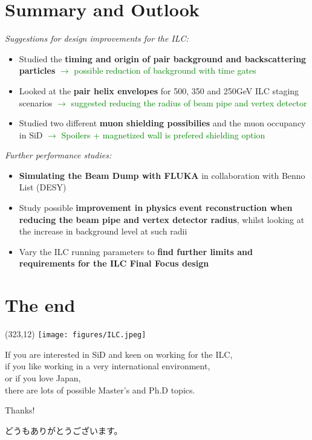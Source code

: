 \documentclass[xcolor={dvipsnames}]{beamer}
\newcommand{\ilclogo}{
  \setlength{\TPHorizModule}{1pt}
  \setlength{\TPVertModule}{1pt}
  \begin{textblock}{1}(323,12)
   \texttt{[image: figures/ILC.jpeg]}
  \end{textblock}
}
\begin{document}
\section{Summary and Outlook}
\begin{frame}
\textit{Suggestions for design improvements for the ILC:}
 \begin{itemize} 
  \item Studied the \textbf{timing and origin of pair background and backscattering particles} \textcolor{Green}{$\rightarrow$ possible reduction of background with time gates}
  \item Looked at the \textbf{pair helix envelopes} for 500, 350 and 250GeV ILC staging scenarios \textcolor{Green}{$\rightarrow$ suggested reducing the radius of beam pipe and vertex detector}
  \item Studied two different \textbf{muon shielding possibilies} and the muon occupancy in SiD \textcolor{Green}{$\rightarrow$ Spoilers + magnetized wall is prefered shielding option}
 \end{itemize}
\textit{Further performance studies:}
 \begin{itemize}
  \item \textbf{Simulating the Beam Dump with FLUKA} in collaboration with Benno List (DESY)
  \item Study possible \textbf{improvement in physics event reconstruction when reducing the beam pipe and vertex detector radius}, whilst looking at the increase in background level at such radii
  \item Vary the ILC running parameters to \textbf{find further limits and requirements for the ILC Final Focus design}
 \end{itemize}
\end{frame}


\section*{The end}
{
\begin{frame}
\ilclogo
\begin{center}
If you are interested in SiD and keen on working for the ILC, \\
if you like working in a very international environment, \\
or if you love Japan,\\
there are lots of possible Master's and Ph.D topics.\\
\vspace*{1cm}
\textcolor{RubineRed}{
	\LARGE Thanks!\\
	\begin{CJK}{UTF8}{min}
	どうもありがとうございます。
	\end{CJK}
}
\end{center}
\end{frame}
}
\end{document}
